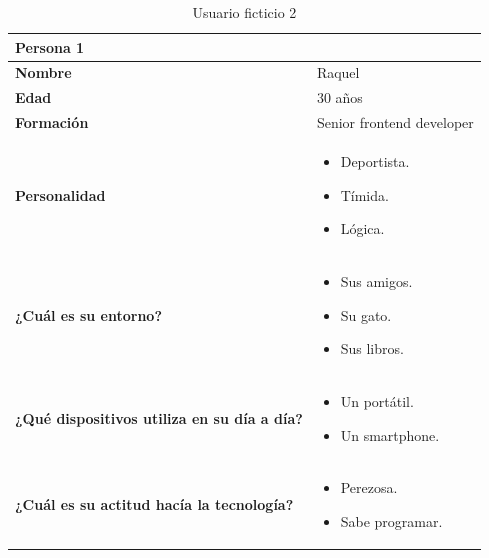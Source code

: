 \begin{table}[H]
	\begin{center}
		\begin{tabular}{| p{} |
                   p{} |}
			\hline
			Persona 1 &  \\ \hline
			\textbf{Nombre} & Raquel \\
			\textbf{Edad} & 30 años \\
			\textbf{Formación} & Senior frontend developer \\
			\textbf{Personalidad} & \begin{itemize}
                \item Deportista.
                \item Tímida.
                \item Lógica.
            \end{itemize} \\
			\textbf{¿Cuál es su entorno?} & \begin{itemize}
                \item Sus amigos.
                \item Su gato.
                \item Sus libros.
            \end{itemize} \\
			\textbf{¿Qué dispositivos utiliza en su día a día?} & \begin{itemize}
                \item Un portátil.
                \item Un smartphone.
            \end{itemize} \\
            \textbf{¿Cuál es su actitud hacía la tecnología?} & \begin{itemize}
                \item Perezosa.
                \item Sabe programar.
            \end{itemize} \\
            \hline
		\end{tabular}
		\caption{Usuario ficticio 2}
	\end{center}
\end{table}

